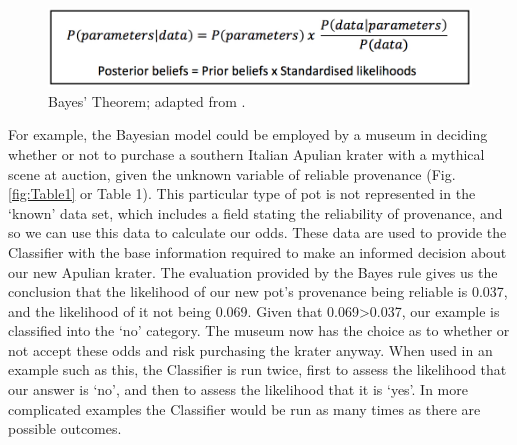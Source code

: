 		\begin{figure}[!htb]
			\includegraphics[width=\linewidth]{figures/thoeming_Fig1}
			\centering
			\caption{Bayes’ Theorem; adapted from \textcite[5]{Bayliss_2007}.}
			\label{fig:Fig1}
		\end{figure}	
	For example, the Bayesian model could be employed by a museum in deciding whether or not to purchase a southern Italian Apulian krater with a mythical scene at auction, given the unknown variable of reliable provenance (Fig. \ref{fig:Table1} or Table 1). This particular type of pot is not represented in the ‘known’ data set, which includes a field stating the reliability of provenance, and so we can use this data to calculate our odds. These data are used to provide the Classifier with the base information required to make an informed decision about our new Apulian krater. The evaluation provided by the Bayes rule gives us the conclusion that the likelihood of our new pot’s provenance being reliable is 0.037, and the likelihood of it not being 0.069. Given that 0.069>0.037, our example is classified into the ‘no’ category. The museum now has the choice as to whether or not accept these odds and risk purchasing the krater anyway. When used in an example such as this, the Classifier is run twice, first to assess the likelihood that our answer is ‘no’, and then to assess the likelihood that it is ‘yes’. In more complicated examples the Classifier would be run as many times as there are possible outcomes.
	
